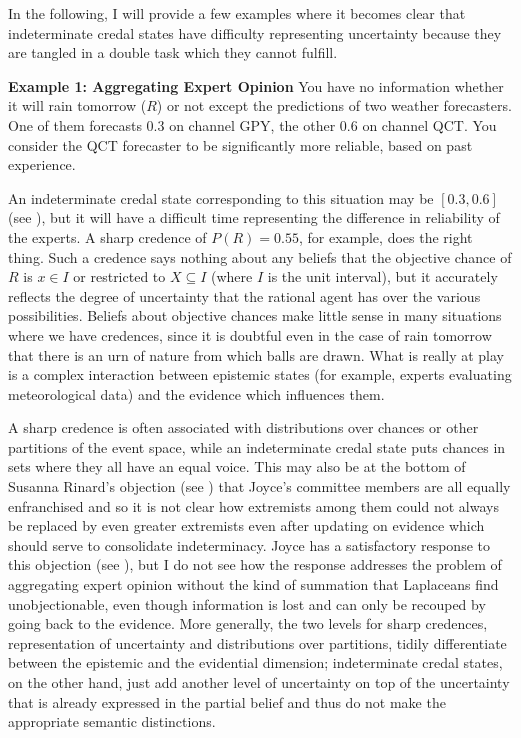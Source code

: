 In the following, I will provide a few examples where
it becomes clear that indeterminate credal states have
difficulty representing uncertainty because they are
tangled in a double task which they cannot fulfill.

\begin{quotex}
  \textbf{Example 1: Aggregating Expert Opinion} You
  have no information whether it will rain tomorrow
  ($R$) or not except the predictions of two weather
  forecasters. One of them forecasts 0.3 on channel
  GPY, the other 0.6 on channel QCT. You consider the
  QCT forecaster to be significantly more reliable,
  based on past experience.
\end{quotex}

An indeterminate credal state corresponding to this
situation may be $[0.3,0.6]$ (see
), but it will have a difficult
time representing the difference in reliability of the
experts. A sharp credence of $P(R)=0.55$, for example,
does the right thing. Such a credence says nothing
about any beliefs that the objective chance of $R$ is
$x\in{}I$ or restricted to $X\subseteq{}I$ (where $I$
is the unit interval), but it accurately reflects the
degree of uncertainty that the rational agent has over
the various possibilities. Beliefs about objective
chances make little sense in many situations where we
have credences, since it is doubtful even in the case
of rain tomorrow that there is an urn of nature from
which balls are drawn. What is really at play is a
complex interaction between epistemic states (for
example, experts evaluating meteorological data) and
the evidence which influences them.

A sharp credence is often associated with distributions
over chances or other partitions of the event space,
while an indeterminate credal state puts chances in
sets where they all have an equal voice. This may also
be at the bottom of Susanna Rinard's objection (see
) that Joyce's committee members
are all equally enfranchised and so it is not clear how
extremists among them could not always be replaced by
even greater extremists even after updating on evidence
which should serve to consolidate indeterminacy. Joyce
has a satisfactory response to this objection (see
), but I do not see how the
response addresses the problem of aggregating expert
opinion without the kind of summation that Laplaceans
find unobjectionable, even though information is lost
and can only be recouped by going back to the evidence.
More generally, the two levels for sharp credences,
representation of uncertainty and distributions over
partitions, tidily differentiate between the epistemic
and the evidential dimension; indeterminate credal
states, on the other hand, just add another level of
uncertainty on top of the uncertainty that is already
expressed in the partial belief and thus do not make
the appropriate semantic distinctions.

